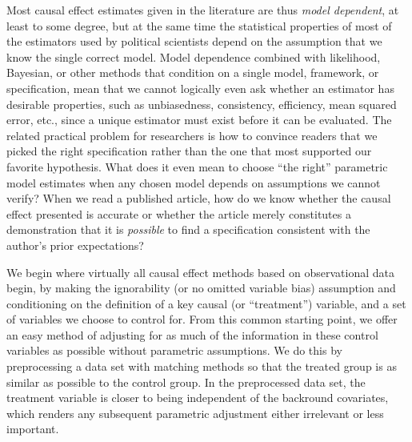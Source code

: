 \documentclass[11pt,titlepage]{article}
\begin{document}
Most causal effect estimates given in the literature are thus
\emph{model dependent}, at least to some degree, but at the same time
the statistical properties of most of the estimators used by political
scientists depend on the assumption that we know the single correct
model.  Model dependence combined with likelihood, Bayesian, or other
methods that condition on a single model, framework, or specification,
mean that we cannot logically even ask whether an estimator has
desirable properties, such as unbiasedness, consistency, efficiency,
mean squared error, etc., since a unique estimator must exist before it
can be evaluated.  The related practical problem for researchers is
how to convince readers that we picked the right specification rather
than the one that most supported our favorite hypothesis.  What does
it even mean to choose ``the right'' parametric model estimates when
any chosen model depends on assumptions we cannot verify?  When we
read a published article, how do we know whether the causal effect
presented is accurate or whether the article merely constitutes a
demonstration that it is \emph{possible} to find a specification
consistent with the author's prior expectations?

We begin where virtually all causal effect methods based on
observational data begin, by making the ignorability (or no omitted
variable bias) assumption and conditioning on the definition of a key
causal (or ``treatment'') variable, and a set of variables we choose
to control for.  From this common starting point, we offer an easy
method of adjusting for as much of the information in these control
variables as possible without parametric assumptions.  We do this by
preprocessing a data set with matching methods so that the treated
group is as similar as possible to the control group.  In the
preprocessed data set, the treatment variable is closer to being
independent of the backround covariates, which renders any subsequent
parametric adjustment either irrelevant or less important.
\end{document}
